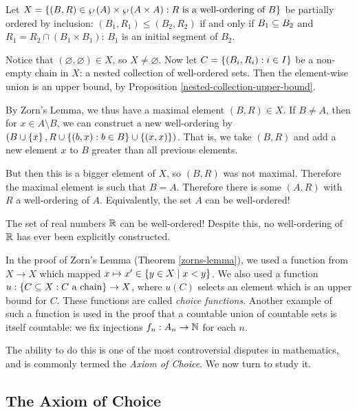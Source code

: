 \documentclass{article}
\begin{document}
\begin{prf}
    Let $X = \left\lbrace (B, R) \in \wp\left(A\right) \times \wp\left(A \times A\right) : R \text{ is a well-ordering of } B \right\rbrace$ be partially ordered by inclusion: $(B_1, R_1) \leq (B_2, R_2)$ if and only if $B_1 \subseteq B_2$ and $R_1 = R_2 \cap (B_1 \times B_1)$: $B_1$ is an initial segment of $B_2$.
    
    Notice that $(\varnothing, \varnothing) \in X$, so $X \neq \varnothing$. Now let $C = \left\lbrace (B_i, R_i) : i \in I \right\rbrace$ be a non-empty chain in $X$: a nested collection of well-ordered sets. Then the element-wise union is an upper bound, by Proposition \ref{nested-collection-upper-bound}.
    
    By Zorn's Lemma, we thus have a maximal element $(B, R) \in X$. If $B \neq A$, then for $x \in A \setminus B$, we can construct a new well-ordering by $(B \cup \left\lbrace x \right\rbrace, R \cup \left\lbrace (b, x) : b \in B \right\rbrace \cup \left\lbrace (x, x) \right\rbrace)$. That is, we take $(B, R)$ and add a new element $x$ to $B$ greater than all previous elements.
    
    But then this is a bigger element of $X$, so $(B, R)$ was not maximal. Therefore the maximal element is such that $B = A$. Therefore there is some $(A, R)$ with $R$ a well-ordering of $A$. Equivalently, the set $A$ can be well-ordered!
\end{prf}

\begin{corollary}
    The set of real numbers $\mathbb{R}$ can be well-ordered! Despite this, no well-ordering of $\mathbb{R}$ has ever been explicitly constructed.
\end{corollary}

In the proof of Zorn's Lemma (Theorem \ref{zorns-lemma}), we used a function from $X \to X$ which mapped $x \mapsto x' \in \left\lbrace y \in X \mid x < y \right\rbrace$. We also used a function $u: \left\lbrace C \subseteq X : C \text{ a chain} \right\rbrace \to X$, where $u(C)$ selects an element which is an upper bound for $C$. These functions are called \textit{choice functions}. Another example of such a function is used in the proof that a countable union of countable sets is itself countable: we fix injections $f_n : A_n \to \mathbb{N}$ for each $n$.

The ability to do this is one of the most controversial disputes in mathematics, and is commonly termed the \textit{Axiom of Choice}. We now turn to study it.


\subsection{The Axiom of Choice}
\end{document}
